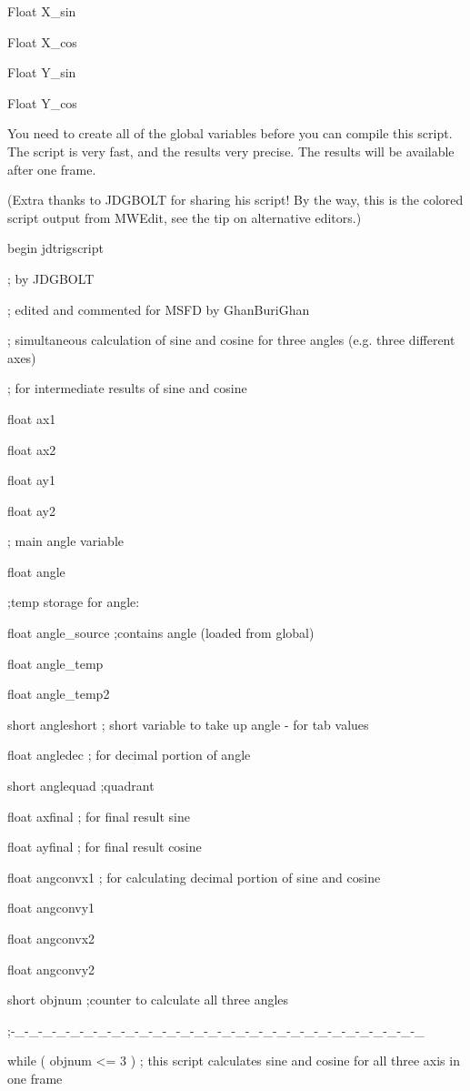 \documentclass[
]{article}
\begin{document}
Float X\_sin

Float X\_cos

Float Y\_sin

Float Y\_cos

You need to create all of the global variables before you can compile
this script. The script is very fast, and the results very precise. The
results will be available after one frame.

(Extra thanks to JDGBOLT for sharing his script! By the way, this is the
colored script output from MWEdit, see the tip on alternative editors.)

begin jdtrigscript

; by JDGBOLT

; edited and commented for MSFD by GhanBuriGhan

; simultaneous calculation of sine and cosine for three angles (e.g.
three different axes)

; for intermediate results of sine and cosine

float ax1

float ax2

float ay1

float ay2

; main angle variable

float angle

;temp storage for angle:

float angle\_source ;contains angle (loaded from global)

float angle\_temp

float angle\_temp2

short angleshort ; short variable to take up angle - for tab values

float angledec ; for decimal portion of angle

short anglequad ;quadrant

float axfinal ; for final result sine

float ayfinal ; for final result cosine

float angconvx1 ; for calculating decimal portion of sine and cosine

float angconvy1

float angconvx2

float angconvy2

short objnum ;counter to calculate all three angles

;-\_-\_-\_-\_-\_-\_-\_-\_-\_-\_-\_-\_-\_-\_-\_-\_-\_-\_-\_-\_-\_-\_-\_-\_-\_-\_-\_-\_-\_-\_

while ( objnum \textless= 3 ) ; this script calculates sine and cosine
for all three axis in one frame
\end{document}
